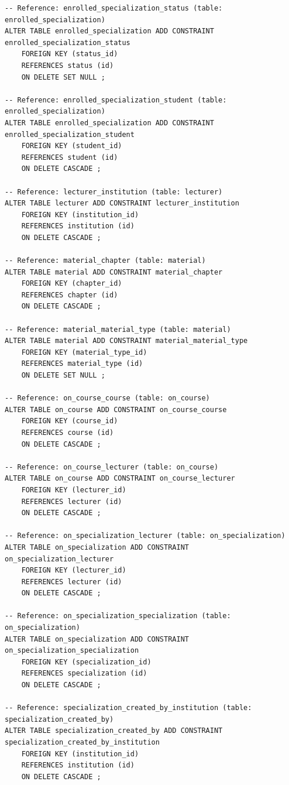 \documentclass[12pt,a4paper,titlepage]{article}
\begin{document}
\begin{lstlisting}
-- Reference: enrolled_specialization_status (table: enrolled_specialization)
ALTER TABLE enrolled_specialization ADD CONSTRAINT enrolled_specialization_status
    FOREIGN KEY (status_id)
    REFERENCES status (id)  
    ON DELETE SET NULL ;

-- Reference: enrolled_specialization_student (table: enrolled_specialization)
ALTER TABLE enrolled_specialization ADD CONSTRAINT enrolled_specialization_student
    FOREIGN KEY (student_id)
    REFERENCES student (id)
    ON DELETE CASCADE ;

-- Reference: lecturer_institution (table: lecturer)
ALTER TABLE lecturer ADD CONSTRAINT lecturer_institution
    FOREIGN KEY (institution_id)
    REFERENCES institution (id)
    ON DELETE CASCADE ;

-- Reference: material_chapter (table: material)
ALTER TABLE material ADD CONSTRAINT material_chapter
    FOREIGN KEY (chapter_id)
    REFERENCES chapter (id)  
    ON DELETE CASCADE ;

-- Reference: material_material_type (table: material)
ALTER TABLE material ADD CONSTRAINT material_material_type
    FOREIGN KEY (material_type_id)
    REFERENCES material_type (id)
    ON DELETE SET NULL ;

-- Reference: on_course_course (table: on_course)
ALTER TABLE on_course ADD CONSTRAINT on_course_course
    FOREIGN KEY (course_id)
    REFERENCES course (id)
    ON DELETE CASCADE ;

-- Reference: on_course_lecturer (table: on_course)
ALTER TABLE on_course ADD CONSTRAINT on_course_lecturer
    FOREIGN KEY (lecturer_id)
    REFERENCES lecturer (id)
    ON DELETE CASCADE ;

-- Reference: on_specialization_lecturer (table: on_specialization)
ALTER TABLE on_specialization ADD CONSTRAINT on_specialization_lecturer
    FOREIGN KEY (lecturer_id)
    REFERENCES lecturer (id)
    ON DELETE CASCADE ;

-- Reference: on_specialization_specialization (table: on_specialization)
ALTER TABLE on_specialization ADD CONSTRAINT on_specialization_specialization
    FOREIGN KEY (specialization_id)
    REFERENCES specialization (id)  
    ON DELETE CASCADE ;

-- Reference: specialization_created_by_institution (table: specialization_created_by)
ALTER TABLE specialization_created_by ADD CONSTRAINT specialization_created_by_institution
    FOREIGN KEY (institution_id)
    REFERENCES institution (id)  
    ON DELETE CASCADE ;


\end{lstlisting}
\end{document}
